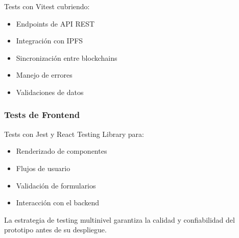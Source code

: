 Tests con Vitest cubriendo:
\begin{itemize}
    \item Endpoints de API REST
    \item Integración con IPFS
    \item Sincronización entre blockchains
    \item Manejo de errores
    \item Validaciones de datos
\end{itemize}

\subsubsection{Tests de Frontend}

Tests con Jest y React Testing Library para:
\begin{itemize}
    \item Renderizado de componentes
    \item Flujos de usuario
    \item Validación de formularios
    \item Interacción con el backend
\end{itemize}

La estrategia de testing multinivel garantiza la calidad y confiabilidad del prototipo antes de su despliegue.
